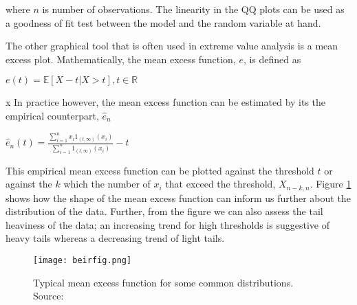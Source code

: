 \documentclass[a4paper]{article}
\begin{document}
\noindent where $n$ is number of observations. The linearity in the QQ plots can be used as a goodness of fit test between the model and the random variable at hand.

The other graphical tool that is often used in extreme value analysis is a mean excess plot. Mathematically, the mean excess function, $e$,  is defined as

 \centerline{$e(t) = \mathbb{E}[X-t | X>t], t \in \mathbb{R}$} 
 x
In practice however, the mean excess function can be estimated by its the empirical counterpart, $\hat{e}_n$ \citep[ch.~1]{beirlant}

\centerline{$\hat{e}_n(t) = \frac{\sum\limits_{i=1}^n x_i 1_{(t,\infty)}(x_i)}{\sum\limits_{i=1}^n 1_{(t,\infty)}(x_i)} - t$}

This empirical mean excess function can be plotted against the threshold $t$ or against the $k$ which the number of $x_i$ that exceed the threshold, $X_{n-k,n}$. Figure \ref{fig:beir} shows how the shape of the mean excess function can inform us further about the distribution of the data. Further, from the figure we can also assess the tail heaviness of the data; an increasing trend for high thresholds is suggestive of heavy tails whereas a decreasing trend of light tails.

\begin{figure}
\centering
\texttt{[image: beirfig.png]}
\caption{Typical mean excess function for some common distributions. Source: \cite{beirlant}}
\label{fig:beir} 
\end{figure}






\end{document}
